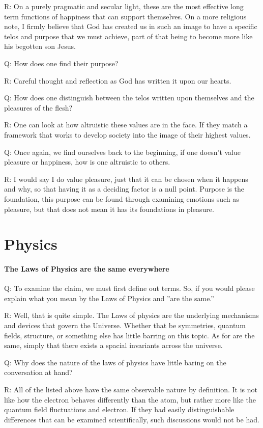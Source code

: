 R: On a purely pragmatic and secular light, these are the most effective long term functions of happiness that can support themselves. On a more religious note, I firmly believe that God has created us in such an image to have a specific telos and purpose that we must achieve, part of that being to become more like his begotten son Jesus.

Q: How does one find their purpose?

R: Careful thought and reflection as God has written it upon our hearts.

Q: How does one distinguish between the telos written upon themselves and the pleasures of the flesh?

R: One can look at how altruistic these values are in the face. If they match a framework that works to develop society into the image of their highest values.

Q: Once again, we find ourselves back to the beginning, if one doesn't value pleasure or happiness, how is one altruistic to others.

R: I would say I do value pleasure, just that it can be chosen when it happens and why, so that having it as a deciding factor is a null point. Purpose is the foundation, this purpose can be found through examining emotions such as pleasure, but that does not mean it has its foundations in pleasure.
\section{Physics}


\paragraph{The Laws of Physics are the same everywhere}
Q: To examine the claim, we must first define out terms. So, if you would please explain what you mean by the Laws of Physics and ''are the same.''

R: Well, that is quite simple. The Laws of physics are the underlying mechanisms and devices that govern the Universe. Whether that be symmetries, quantum fields, structure, or something else has little barring on this topic. As for are the same, simply that there exists a spacial invariants across the universe.

Q: Why does the nature of the laws of physics have little baring on the conversation at hand?

R: All of the listed above have the same observable nature by definition. It is not like how the electron behaves differently than the atom, but rather more like the quantum field fluctuations and electron. If they had easily distinguishable differences that can be examined scientifically, such discussions would not be had.

